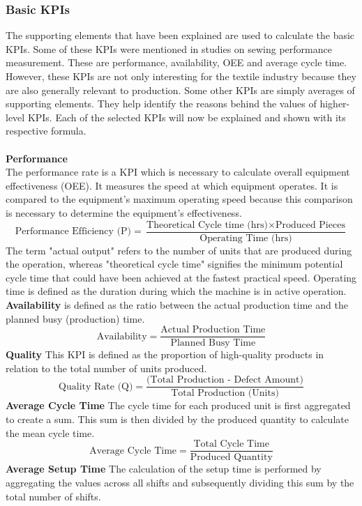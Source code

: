 {\subsubsection{Basic KPIs}
The supporting elements that have been explained are used to calculate the basic KPIs.
Some of these KPIs were mentioned in studies on sewing performance measurement. These are performance, availability, OEE and average cycle time. However, these KPIs are not only interesting for the textile industry because they are also generally relevant to production. Some other KPIs are simply averages of supporting elements. They help identify the reasons behind the values of higher-level KPIs. Each of the selected KPIs will now be explained and shown with its respective formula.\\
\\
\textbf{Performance}\\
The performance rate is a KPI which is necessary to calculate overall equipment effectiveness (OEE). It measures the speed at which equipment operates. It is compared to the equipment's maximum operating speed because this comparison is necessary to determine the equipment's effectiveness. \cite{muchiriPerformanceMeasurementUsing2008}
\[
\text{Performance Efficiency (P)} = \frac{\text{Theoretical Cycle time (hrs)} \times \text{Produced Pieces}}{\text{Operating Time (hrs)}}
\]
The term "actual output" refers to the number of units that are produced during the operation, whereas "theoretical cycle time" signifies the minimum potential cycle time that could have been achieved at the fastest practical speed. Operating time is defined as the duration during which the machine is in active operation.\\
\textbf{Availability}
is defined as the ratio between the actual production time and the planned busy (production) time.
\[
\text{Availability} = \frac{\text{Actual Production Time}}{\text{Planned Busy Time}}
\]
\textbf{Quality}
This KPI is defined as the proportion of high-quality products in relation to the total number of units produced.
\[
\text{Quality Rate (Q)} = \frac{\text{(Total Production - Defect Amount)}}{\text{Total Production (Units)}} 
\]
\textbf{Average Cycle Time}
The cycle time for each produced unit is first aggregated to create a sum. This sum is then divided by the produced quantity to calculate the mean cycle time.
\[
\text{Average Cycle Time} = \frac{\text{Total Cycle Time}}{\text{Produced Quantity}}
\]
\textbf{Average Setup Time}
The calculation of the setup time is performed by aggregating the values across all shifts and subsequently dividing this sum by the total number of shifts.
}
